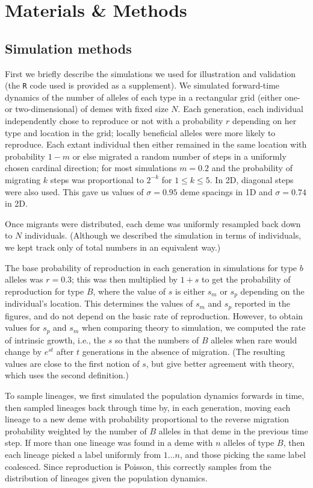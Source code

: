 \documentclass{article}
\newcommand{\linelabel}[1]{}
\newcommand{\revpoint}[2]{}
\begin{document}
\section*{Materials \& Methods}

\subsection{Simulation methods}
\label{ss:simulations}

First we briefly describe the simulations we used for illustration and validation
(the \texttt{R} code used is provided as a supplement).
We simulated forward-time dynamics of the number of alleles of each type in a rectangular grid (either one- or two-dimensional) of demes with fixed size $N$.
Each generation, each individual independently chose to reproduce or not with a probability $r$ depending on her type and location in the grid;
locally beneficial alleles were more likely to reproduce.
Each extant individual then either remained in the same location with probability $1-m$
or else migrated a random number of steps 
in a uniformly chosen cardinal direction; 
for most simulations $m=0.2$ and
the probability of migrating $k$ steps was proportional to $2^{-k}$ for $1\le k \le 5$.
In 2D, diagonal steps were also used.
This gave us values of $\sigma=0.95$ deme spacings in 1D
and $\sigma=0.74$ in 2D.
\linelabel{rr:sim_details}
Once migrants were distributed, each deme was uniformly resampled back down to $N$ individuals.
(Although we described the simulation in terms of individuals,
we kept track only of total numbers in an equivalent way.)

The base probability of reproduction in each generation in simulations for type $b$ alleles was $r=0.3$;
this was then multiplied by $1+s$ to get the probability of reproduction for type $B$,
where the value of $s$ is either $s_m$ or $s_p$ depending on the individual's location.
This determines the values of $s_m$ and $s_p$ reported in the figures, 
and do not depend on the basic rate of reproduction. \revpoint{2}{5}
However, to obtain values for $s_p$ and $s_m$ when comparing theory to simulation,
we computed the rate of intrinsic growth, 
i.e., the $s$ so that the numbers of $B$ alleles when rare would change by $e^{st}$ after $t$ generations
in the absence of migration.
(The resulting values are close to the first notion of $s$,
but give better agreement with theory,
which uses the second definition.)

To sample lineages, we first simulated the population dynamics forwards in time,
then sampled lineages back through time
by, in each generation,
moving each lineage to a new deme with probability proportional to the reverse migration probability
weighted by the number of $B$ alleles in that deme in the previous time step.
If more than one lineage was found in a deme with $n$ alleles of type $B$,
then each lineage picked a label uniformly from $1 \ldots n$,
and those picking the same label coalesced.
Since reproduction is Poisson, this correctly samples from the distribution of lineages given the population dynamics.
\end{document}
